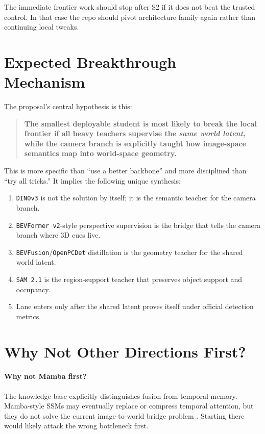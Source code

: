 \documentclass[11pt]{article}
\begin{document}
The immediate frontier work should stop after S2 if it does not beat the trusted control. In that
case the repo should pivot architecture family again rather than continuing local tweaks.

\section{Expected Breakthrough Mechanism}
The proposal's central hypothesis is this:
\begin{quote}
\textbf{The smallest deployable student is most likely to break the local frontier if all heavy teachers
supervise the \emph{same world latent}, while the camera branch is explicitly taught how image-space
semantics map into world-space geometry.}
\end{quote}

This is more specific than ``use a better backbone'' and more disciplined than ``try all tricks.''
It implies the following unique synthesis:
\begin{enumerate}[leftmargin=*,itemsep=2pt]
\item \texttt{DINOv3} is not the solution by itself; it is the semantic teacher for the camera
branch.
\item \texttt{BEVFormer v2}-style perspective supervision is the bridge that tells the camera
branch where 3D cues live.
\item \texttt{BEVFusion}/\texttt{OpenPCDet} distillation is the geometry teacher for the shared
world latent.
\item \texttt{SAM 2.1} is the region-support teacher that preserves object support and occupancy.
\item Lane enters only after the shared latent proves itself under official detection metrics.
\end{enumerate}

\section{Why Not Other Directions First?}
\paragraph{Why not Mamba first?}
The knowledge base explicitly distinguishes fusion from temporal memory. Mamba-style SSMs may eventually
replace or compress temporal attention, but they do not solve the current image-to-world bridge
problem \cite{mamba}. Starting there would likely attack the wrong bottleneck first.
\end{document}
